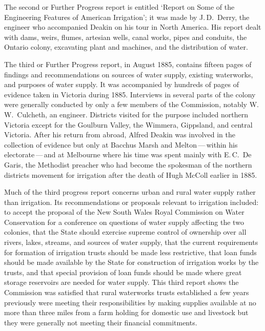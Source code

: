 The second or Further Progress report is entitled `Report on Some of
the Engineering Features of American Irrigation'; it was made by
J.\,D.~Derry,  the engineer who accompanied
Deakin on his tour in North America.  His report dealt with dams,
weirs, flumes, artesian wells, canal works, pipes and conduits, the
Ontario  colony, excavating plant and machines, and the
distribution of water.

The third or Further Progress report, in August 1885, contains fifteen
pages of findings and recommendations on sources of water supply,
existing waterworks, and purposes of water supply.  It was accompanied
by hundreds of pages of evidence taken in Victoria during 1885.
Interviews in several parts of the colony were generally conducted by
only a few members of the Commission, notably W.\,W.~Culcheth,
 an
engineer.  Districts visited for the purpose included northern
Victoria except for the Goulburn Valley,  the
Wimmera,  Gippsland,  and
central Victoria.  After his return from abroad, Alfred Deakin was
involved in the collection of evidence but only at Bacchus Marsh
 and  
Melton\,---\,within his electorate\,---\,and at Melbourne where his
time was spent mainly with E.\,C.~De Garis, 
the Methodist preacher who had become the spokesman of the northern
districts movement for irrigation after the death of Hugh McColl
earlier in 1885.

Much of the third progress report concerns urban and rural water
supply rather than irrigation.  Its recommendations or proposals
relevant to irrigation included: to accept the proposal of the New
South Wales Royal Commission on Water Conservation  for a conference on questions of
water supply affecting the two colonies, that the State should
exercise supreme control of ownership over all rivers, lakes, streams,
and sources of water supply, that the current requirements for
formation of irrigation trusts should be made less restrictive, that
loan funds should be made available by the State for construction of
irrigation works by the trusts, and that special provision of loan
funds should be made where great storage reservoirs are needed for
water supply.  This third report shows the Commission was satisfied
that rural waterworks trusts
 established a few years previously were
meeting their responsibilities by making supplies available at no more
than three miles from a farm holding for domestic use and livestock
but they were generally not meeting their financial commitments.

